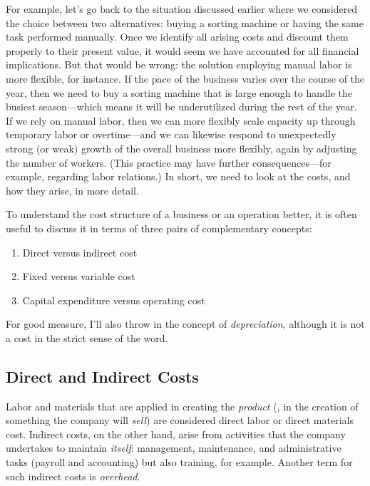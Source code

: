 For example, let's go back to the situation discussed earlier where we
considered the choice between two alternatives: buying a sorting
machine or having the same task performed manually.  Once we identify
all arising costs and discount them properly to their present value,
it would seem we have accounted for all financial implications.  But
that would be wrong: the solution employing manual labor is more
flexible, for instance. If the pace of the business varies over the
course of the year, then we need to buy a sorting machine that is
large enough to handle the busiest season---which means it will be
underutilized during the rest of the year. If we rely on manual labor,
then we can more flexibly scale capacity up through temporary labor or
overtime---and we can likewise respond to unexpectedly strong (or
weak) growth of the overall business more flexibly, again by adjusting
the number of workers. (This practice may have further
consequences---for example, regarding labor relations.) In short, we
need to look at the costs, and how they arise, in more detail.

To understand the cost structure of a business or an operation better,
it is often useful to discuss it in terms of three pairs of
complementary concepts:

\begin{enumerate}
\item Direct versus indirect cost
\item Fixed versus variable cost
\item Capital expenditure versus operating cost
\end{enumerate}

For good measure, I'll also throw in the concept of
\emph{depreciation}, although it is not a cost in the strict sense of
the word.

\subsection{Direct and Indirect Costs}

  
Labor and materials that are applied in creating the \emph{product}
(\ie, in the creation of something the company will \emph{sell}) are
considered direct labor or direct materials cost.  Indirect costs, on
the other hand, arise from activities that the company undertakes
to maintain \emph{itself}: management, maintenance, and administrative
tasks (payroll and accounting) but also training, for example. Another
term for such indirect costs is \emph{overhead}.


